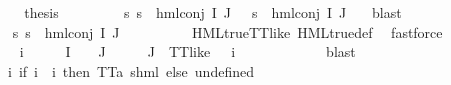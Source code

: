 \begin{isabellebody}
\ \ \ \ \isamarkupfalse%
\ \isamarkupfalse%
\ {\isacharquery}{\kern0pt}thesis\ \isanewline
\ \ \ \ \ \ \isamarkupfalse%
\ {\isacartoucheopen}{\isasymforall}s{\isachardot}{\kern0pt}\ {\isacharparenleft}{\kern0pt}s\ {\isasymTurnstile}\ hml{\isacharunderscore}{\kern0pt}conj\ I\ J\ {\isasymPhi}{\isacharparenright}{\kern0pt}\ {\isacharequal}{\kern0pt}\ {\isacharparenleft}{\kern0pt}s\ {\isasymTurnstile}\ {\isacharparenleft}{\kern0pt}hml{\isacharunderscore}{\kern0pt}conj\ I{\isacharprime}{\kern0pt}\ J\ {\isasymPsi}{\isacharparenright}{\kern0pt}{\isacharparenright}{\kern0pt}{\isacartoucheclose}\ \isamarkupfalse%
\ blast\isanewline
\ \ \isamarkupfalse%
\isanewline
\ \ \ \ \isamarkupfalse%
\ {}\isanewline
\ \ \ \ \isamarkupfalse%
\ {\isachardoublequoteopen}{\isasymforall}s{\isachardot}{\kern0pt}\ {\isasymnot}s\ {\isasymTurnstile}\ {\isacharparenleft}{\kern0pt}hml{\isacharunderscore}{\kern0pt}conj\ I\ J\ {\isasymPhi}{\isacharparenright}{\kern0pt}{\isachardoublequoteclose}\ \isanewline
\ \ \ \ \ \ \isamarkupfalse%
\ HML{\isacharunderscore}{\kern0pt}true{\isacharunderscore}{\kern0pt}TT{\isacharunderscore}{\kern0pt}like\ HML{\isacharunderscore}{\kern0pt}true{\isacharunderscore}{\kern0pt}def\ \isamarkupfalse%
\ fastforce\ \isanewline
\ \ \ \ \isamarkupfalse%
\ {\isasymphi}\ i{\isacharunderscore}{\kern0pt}{\isasymphi}\ \ {\isachardoublequoteopen}{\isasymphi}\ {\isasymin}\ {\isasymPhi}\ {\isacharbackquote}{\kern0pt}\ I\ {\isasyminter}\ {\isasymPhi}\ {\isacharbackquote}{\kern0pt}\ J\ {\isasymor}\ {\isacharparenleft}{\kern0pt}{\isasymphi}\ {\isasymin}\ {\isasymPhi}\ {\isacharbackquote}{\kern0pt}\ J\ {\isasymand}\ TT{\isacharunderscore}{\kern0pt}like\ {\isasymphi}{\isacharparenright}{\kern0pt}{\isachardoublequoteclose}\ {\isachardoublequoteopen}{\isasymPhi}\ i{\isacharunderscore}{\kern0pt}{\isasymphi}\ {\isacharequal}{\kern0pt}\ {\isasymphi}{\isachardoublequoteclose}\isanewline
\ \ \ \ \ \ \isamarkupfalse%
\ {}\ \isamarkupfalse%
\ blast\isanewline
\ \ \ \ \isamarkupfalse%
\ {\isasymPsi}\ \ {\isachardoublequoteopen}{\isasymPsi}\ {\isasymequiv}\ {\isacharparenleft}{\kern0pt}{\isasymlambda}i{\isachardot}{\kern0pt}\ {\isacharparenleft}{\kern0pt}if\ i\ {\isacharequal}{\kern0pt}\ i{\isacharunderscore}{\kern0pt}{\isasymphi}\ then\ TT{\isacharcolon}{\kern0pt}{\isacharcolon}{\kern0pt}{\isacharparenleft}{\kern0pt}{\isacharprime}{\kern0pt}a{\isacharcomma}{\kern0pt}\ {\isacharprime}{\kern0pt}s{\isacharparenright}{\kern0pt}hml\ else\ undefined{\isacharparenright}{\kern0pt}{\isacharparenright}{\kern0pt}{\isachardoublequoteclose}\isanewline

\end{isabellebody}
